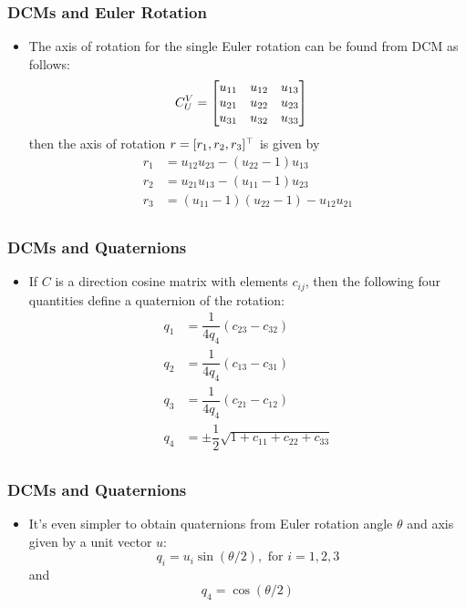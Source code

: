 \begin{frame}
\frametitle{DCMs and Euler Rotation}
 \begin{itemize}
 \item The axis of rotation for the single Euler rotation can be found from DCM as follows:
\begin{align*}
C_{U}^{V}&=
\begin{bmatrix}
u_{11}& u_{12} & u_{13}\\
u_{21} & u_{22} & u_{23}\\
u_{31} & u_{32} & u_{33}\\
\end{bmatrix}
\end{align*}
then the axis of rotation $r = [r_1,r_2,r_3]^\top$ is given by
\begin{align*}
r_1 &= u_{12}u_{23} - (u_{22}-1)u_{13}\\
r_2 &= u_{21}u_{13} - (u_{11}-1)u_{23}\\
r_3 &= (u_{11}-1)(u_{22}-1) - u_{12}u_{21}\\
\end{align*}
\end{itemize}
\end{frame}

\begin{frame}
\frametitle{DCMs and Quaternions}
 \begin{itemize}
 \item If $C$ is a direction cosine matrix with elements $c_{ij}$, then the following four quantities define a quaternion of the rotation:
\begin{align*}
q_1 &= \dfrac{1}{4q_4}(c_{23}-c_{32})\\
q_2 &= \dfrac{1}{4q_4}(c_{13}-c_{31})\\
q_3 &= \dfrac{1}{4q_4}(c_{21}-c_{12})\\
q_4 &= \pm \dfrac{1}{2}\sqrt{1+c_{11}+c_{22}+c_{33}}\\
\end{align*}
\end{itemize}
\end{frame}

\begin{frame}
\frametitle{DCMs and Quaternions}
 \begin{itemize}
 \item It's even simpler to obtain quaternions from Euler rotation angle $\theta$ and axis given by a unit vector $u$:
\[q_i=u_i\sin(\theta/2), \text{ for } i=1,2,3\]
and
\[q_4=\cos(\theta/2)\]
\end{itemize}
\end{frame}


